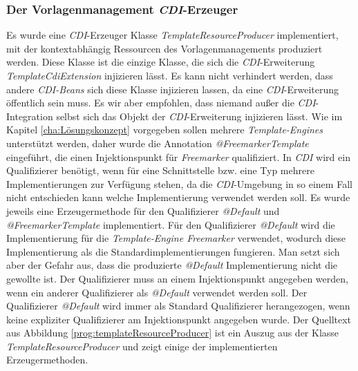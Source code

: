 \subsubsection{Der Vorlagenmanagement \emph{CDI}-Erzeuger}
Es wurde eine \emph{CDI}-Erzeuger Klasse \emph{TemplateResourceProducer} implementiert, mit der kontextabhängig Ressourcen des Vorlagenmanagements produziert werden. Diese Klasse ist die einzige Klasse, die sich die \emph{CDI}-Erweiterung \emph{TemplateCdiExtension} injizieren lässt. Es kann nicht verhindert werden, dass andere \emph{CDI-Beans} sich diese Klasse injizieren lassen, da eine \emph{CDI}-Erweiterung öffentlich sein muss. Es wir aber empfohlen, dass niemand außer die \emph{CDI}-Integration selbst sich das Objekt der \emph{CDI}-Erweiterung injizieren lässt.
\newline
\newline
Wie im Kapitel \ref{cha:Lösungskonzept} vorgegeben sollen mehrere \emph{Template-Engines} unterstützt werden, daher wurde die Annotation \emph{@FreemarkerTemplate} eingeführt, die einen Injektionspunkt für \emph{Freemarker} qualifiziert. In \emph{CDI} wird ein Qualifizierer benötigt, wenn für eine Schnittstelle bzw. eine Typ mehrere Implementierungen zur Verfügung stehen, da die \emph{CDI}-Umgebung in so einem Fall nicht entschieden kann welche Implementierung verwendet werden soll. Es wurde jeweils eine Erzeugermethode für den Qualifizierer \emph{@Default} und \emph{@FreemarkerTemplate} implementiert. Für den Qualifizierer \emph{@Default} wird die Implementierung für die \emph{Template-Engine Freemarker} verwendet, wodurch diese Implementierung als die Standardimplementierungen fungieren. Man setzt sich aber der Gefahr aus, dass die produzierte \emph{@Default} Implementierung nicht die gewollte ist. Der Qualifizierer muss an einem Injektionspunkt angegeben werden, wenn ein anderer Qualifizierer als \emph{@Default} verwendet werden soll. Der Qualifizierer \emph{@Default} wird immer als Standard Qualifizierer herangezogen, wenn keine expliziter Qualifizierer am Injektionspunkt angegeben wurde.
\newline
\newline
Der Quelltext aus Abbildung \ref{prog:templateResourceProducer} ist ein Auszug aus der Klasse \emph{TemplateResourceProducer} und zeigt einige der implementierten Erzeugermethoden. 
\newpage

